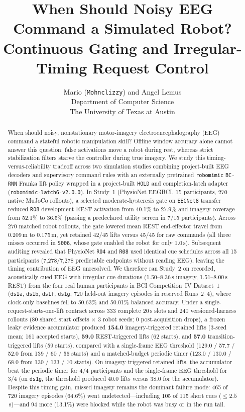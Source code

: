 \documentclass{article}
\title{When Should Noisy EEG Command a Simulated Robot?\\Continuous Gating and Irregular-Timing Request Control}
\author{
  Mario (\texttt{Mohnclizzy}) and Angel Lemus\\
  Department of Computer Science\\
  The University of Texas at Austin
}
\begin{document}
\maketitle

\begin{abstract}
When should noisy, nonstationary motor-imagery electroencephalography (EEG) command a stateful robotic manipulation skill? Offline window accuracy alone cannot answer this question: false activations move a robot during rest, whereas strict stabilization filters starve the controller during true imagery. We study this timing-versus-reliability tradeoff across two simulation studies combining project-built EEG decoders and supervisory command rules with an externally pretrained \texttt{robomimic} \texttt{BC-RNN} Franka lift policy wrapped in a project-built \texttt{HOLD} and completion-latch adapter (\texttt{robomimic-latch6-v2.0.0}).
In Study~1 (PhysioNet EEGBCI, 15 participants, 270 native MuJoCo rollouts), a selected moderate-hysteresis gate on \texttt{EEGNet8} transfer reduced \texttt{R08} development REST activation from 40.1\% to 27.9\% and imagery coverage from 52.1\% to 36.5\% (passing a predeclared utility screen in 7/15 participants). Across 270 matched robot rollouts, the gate lowered mean REST end-effector travel from 0.209\,m to 0.175\,m, yet retained 42/45 lifts versus 45/45 for raw commands (all three misses occurred in \texttt{S006}, whose gate enabled the robot for only 1.0\,s). Subsequent auditing revealed that PhysioNet \texttt{R04} and \texttt{R08} used identical cue schedules across all 15 participants (7,278/7,278 predictable endpoints without reading EEG), leaving the timing contribution of EEG unresolved.
We therefore ran Study~2 on recorded, acoustically cued EEG with irregular cue durations (1.50--8.36\,s imagery, 1.51--8.00\,s REST) from the four real human participants in BCI Competition~IV Dataset~1 (\texttt{ds1a}, \texttt{ds1b}, \texttt{ds1f}, \texttt{ds1g}; 720 held-out imagery episodes in reserved Runs~2--4), where clock-only baselines fell to 50.63\% and 50.01\% balanced accuracy. Under a single-request-starts-one-lift contract across 333 complete 20\,s slots and 240 versioned-harness rollouts (80 shared start offsets $\times$ 3 robot seeds; 0 post-acquisition drops), a frozen leaky evidence accumulator produced \textbf{154.0} imagery-triggered retained lifts (3-seed mean; 161 accepted starts), \textbf{59.0} REST-triggered lifts (62 starts), and \textbf{57.0} transition-triggered lifts (59 starts), compared with a single-frame EEG threshold (129.0 / 57.7 / 52.0 from 139 / 60 / 56 starts) and a matched-budget periodic timer (123.0 / 130.0 / 68.0 from 130 / 133 / 70 starts). On imagery-triggered retained lifts, the accumulator beat the periodic timer for 4/4 participants and the single-frame EEG threshold for 3/4 (on \texttt{ds1g}, the threshold produced 40.0 lifts versus 38.0 for the accumulator). Despite this timing gain, missed imagery remains the dominant failure mode: 465 of 720 imagery episodes (64.6\%) went undetected---including 105 of 115 short cues ($\le 2.5$\,s)---and 94 more (13.1\%) were blocked while the robot was busy or in the run tail.
\end{abstract}
\end{document}
